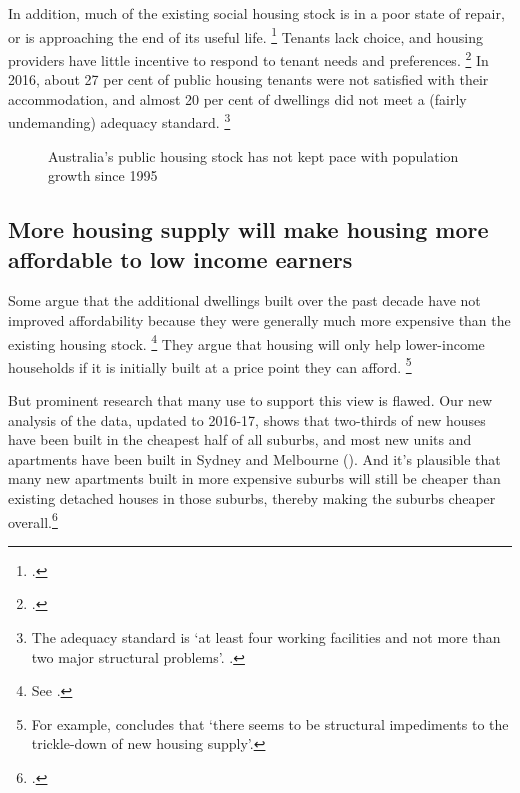 In addition, much of the existing social housing stock is in a poor state of repair, or is approaching the end of its useful life.
 	\footcite[][27]{AIHW2014HousingAssist}
Tenants lack choice, and housing providers have little incentive to respond to tenant needs and preferences.
	\footcite{Potter-2017-Affordablehousing}
In 2016, about 27 per cent of public housing tenants were not satisfied with their accommodation, and almost 20 per cent of dwellings did not meet a (fairly undemanding) adequacy standard.%
    \footnote{The adequacy standard is `at least four working facilities and not more than two major structural problems'. \textcite[][Table~18A.36.]{PC2017GovServ}.}

\begin{figure}
\caption{Australia's public housing stock has not kept pace with population growth since 1995}\label{fig:public-housing-stock}
\end{figure}


\subsection{More housing supply will make housing more affordable to low income earners }\label{subsec:additional-housing-was-primarily-above-average-quality-although-this-is-less-of-a-problem}

Some argue that the additional dwellings built over the past decade have not improved affordability because they were generally much more expensive than the existing housing stock.%
	\footnote{See \textcites[][16]{OngEtAl-AHURI-2017-Housing-supply-responsiveness}[][12]{GurranEtAl2015Housing}.}
They argue that housing will only help lower-income households if it is initially built at a price point they can afford.%
    \footnote{For example, \textcite[][1]{OngEtAl-AHURI-2017-Housing-supply-responsiveness} concludes that `there seems to be structural impediments to the trickle-down of new housing supply'.} %

But prominent research that many use to support this view is flawed. Our new analysis of the data, updated to 2016-17, shows that two-thirds of new houses have been built in the cheapest half of all suburbs, and most new units and apartments have been built in Sydney and Melbourne (). And it's plausible that many new apartments built in more expensive suburbs will still be cheaper than existing detached houses in those suburbs, thereby making the suburbs cheaper overall.\footcite{Coates-Wiltshire-2018-InsideStory-conventional-wisdom-wrong}

